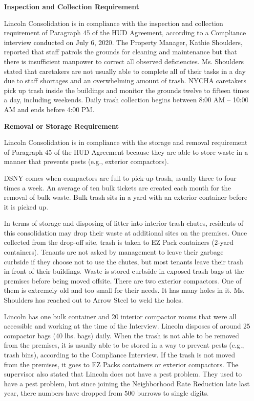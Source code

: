 

\textbf{Inspection and Collection Requirement} 

Lincoln Consolidation is in compliance with the inspection and collection requirement of Paragraph 45 of the HUD Agreement, according to a Compliance interview conducted on July 6, 2020. The Property Manager, Kathie Shoulders, reported that staff patrols the grounds for cleaning and maintenance but that  there is insufficient manpower to correct all observed deficiencies. Ms. Shoulders stated that caretakers are not usually able to complete all of their tasks in a day due to staff shortages and an overwhelming amount of trash.  NYCHA caretakers pick up trash inside the buildings and monitor the grounds twelve to fifteen times a day, including weekends. Daily trash collection begins between 8:00 AM -- 10:00 AM and ends before 4:00 PM. 

 

\textbf{Removal or Storage Requirement} 

Lincoln Consolidation is in compliance with the storage and removal requirement of Paragraph 45 of the HUD Agreement because they are able to store waste in a manner that prevents pests (e.g., exterior compactors).

DSNY comes when compactors are full to pick-up trash, usually three to four times a week. An average of ten bulk tickets are created each month for the removal of bulk waste. Bulk trash sits in a yard with an exterior container before it is picked up.  

 

In terms of storage and disposing of litter into interior trash chutes, residents of this consolidation may drop their waste at additional sites on the premises. Once collected from the drop-off site, trash is taken to EZ Pack containers (2-yard containers). Tenants are not asked by management to leave their garbage curbside if they choose not to use the chutes, but most tenants leave their trash in front of their buildings. Waste is stored curbside in exposed trash bags at the premises before being moved offsite. There are two exterior compactors. One of them is extremely old and too small for their needs. It has many holes in it. Ms. Shoulders has reached out to Arrow Steel to weld the holes. 

 

Lincoln has one bulk container and 20 interior compactor rooms that were all accessible and working at the time of the Interview. Lincoln disposes of around 25 compactor bags (40 lbs. bags) daily. When the trash is not able to be removed from the premises, it is  usually able to be stored in a way to prevent pests (e.g., trash bins), according to the Compliance Interview. If the trash is not moved from the premises, it goes to EZ Packs containers or exterior compactors. The supervisor also stated that Lincoln does not have a pest problem. They used to have a pest problem, but since joining the Neighborhood Rate Reduction late last year, there numbers have dropped from 500 burrows to single digits.  

